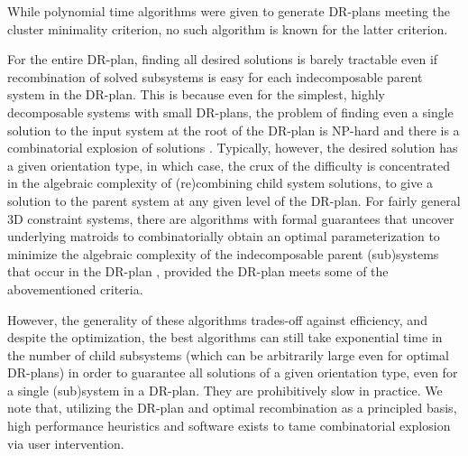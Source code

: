 While polynomial time algorithms were given \cite{hoffman2001decompositionI} to generate DR-plans meeting the cluster minimality criterion, no such algorithm is known for the latter criterion.


\medskip\noindent
{}
For the entire DR-plan, finding all desired solutions is barely tractable even if recombination of solved subsystems is easy for each indecomposable parent system in the DR-plan. This is because even for the simplest, highly decomposable systems with small DR-plans, the problem of finding even a single solution to the input system at the root of the DR-plan is NP-hard  \cite{saxe1979embeddability} and there is a combinatorial explosion of solutions \cite{borcea2004number}. Typically, however, the desired solution has a given orientation type, in which case, the crux of the difficulty is concentrated in the algebraic complexity of (re)combining child system solutions, to give a solution to the parent system at any given level of the DR-plan. For fairly general 3D constraint systems, there are algorithms with formal guarantees that uncover underlying matroids to combinatorially obtain an optimal parameterization to minimize the algebraic complexity of the indecomposable parent (sub)systems that occur in the DR-plan \cite{sitharam2010optimized,sitharam2006well,sitharam2010reconciling}, provided the DR-plan meets some of the abovementioned criteria.

However, the generality of these algorithms trades-off against efficiency, and despite the optimization, the best algorithms can still take exponential time in the number of child subsystems (which can be arbitrarily large even for optimal DR-plans) in order to guarantee all solutions of a given orientation type, even for a single (sub)system in a DR-plan. They are prohibitively slow in practice. We note that, utilizing the DR-plan and optimal recombination as a principled basis, high performance heuristics and software exists \cite{sitharam2006solution} to tame combinatorial explosion via user intervention.


